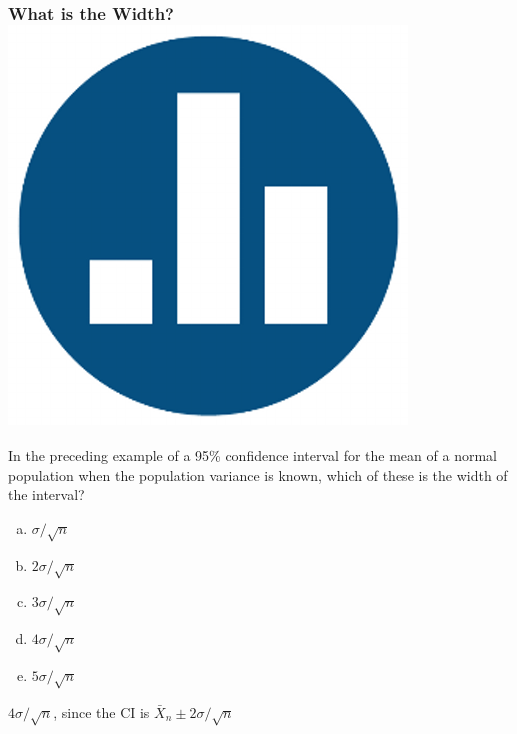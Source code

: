 \documentclass[handout]{beamer}
\begin{document}
\begin{frame}
\frametitle{What is the Width?\hfill \includegraphics[scale = 0.05]{./images/clicker}}
In the preceding example of a  95\% confidence interval for the mean of a normal population when the population variance is known, which of these is the width of the interval?
	\begin{enumerate}[(a)]
		\item $\sigma/\sqrt{n}$
		\item $2\sigma/\sqrt{n}$
		\item $3\sigma/\sqrt{n}$
		\item $4\sigma/\sqrt{n}$
		\item $5\sigma/\sqrt{n}$
	\end{enumerate}
\pause
\vspace{1em}
\alert{\large $4\sigma/\sqrt{n}$, since the CI is $\bar{X}_n \pm 2\sigma/\sqrt{n}$}
\end{frame}
\end{document}
